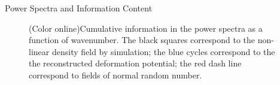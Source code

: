 \begin{section}{Power Spectra and Information Content}
\begin{figure}[htbp]
\begin{center}
   \caption{(Color online)Cumulative information in the power spectra as a function of wavenumber. The black squares correspond to the non-linear density field by simulation; the blue cycles correspond to the the reconstructed deformation potential; the red dash line correspond to fields of normal random number.}
  \label{fig:fisherinfo}
 \end{center}
\end{figure}


\end{section}
